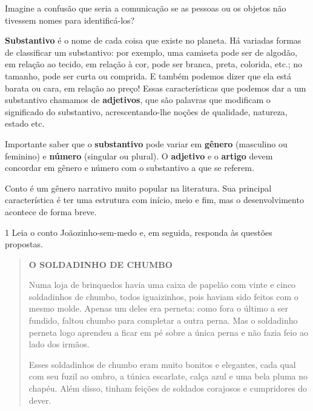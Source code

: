 \begin{escolha}
\begin{escolha}
{\begin{escolha}
{Imagine a confusão que seria a comunicação se as pessoas ou os objetos
não tivessem nomes para identificá-los?~

\textbf{Substantivo} é o nome de cada coisa que existe no planeta. Há
variadas formas de classificar um substantivo: por exemplo, uma camiseta
pode ser de algodão, em relação ao tecido, em relação à cor, pode ser
branca, preta, colorida, etc.; no tamanho, pode ser curta ou comprida. E
também podemos dizer que ela está barata ou cara, em relação ao preço!
Essas características que podemos dar a um substantivo chamamos de
\textbf{adjetivos}, que são palavras que modificam o significado do
substantivo, acrescentando-lhe noções de qualidade, natureza, estado
etc.

Importante saber que o \textbf{substantivo} pode variar em
\textbf{gênero} (masculino ou feminino) e \textbf{número} (singular ou
plural). O \textbf{adjetivo} e o \textbf{artigo} devem concordar em
gênero e número com o substantivo a que se referem.
}


Conto é um gênero narrativo muito popular na literatura. Sua principal
característica é ter uma estrutura com início, meio e fim, mas o
desenvolvimento acontece de forma breve.


\num{1} Leia o conto Joãozinho-sem-medo e, em seguida, responda às questões propostas.

\begin{quote}
\textbf{O SOLDADINHO DE CHUMBO}


Numa loja de brinquedos havia uma caixa de papelão com vinte e cinco
soldadinhos de chumbo, todos iguaizinhos, pois haviam sido feitos com o
mesmo molde. Apenas um deles era perneta: como fora o último a ser
fundido, faltou chumbo para completar a outra perna. Mas o soldadinho
perneta logo aprendeu a ficar em pé sobre a única perna e não fazia feio
ao lado dos irmãos.

Esses soldadinhos de chumbo eram muito bonitos e elegantes, cada qual
com seu fuzil ao ombro, a túnica escarlate, calça azul e uma bela pluma
no chapéu. Além disso, tinham feições de soldados corajosos e
cumpridores do dever.


\end{quote}
\end{escolha}}
\end{escolha}
\end{escolha}
